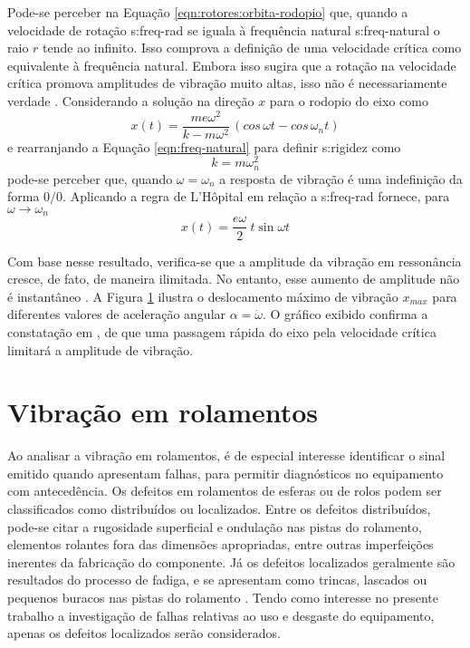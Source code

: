 \documentclass[12pt,oneside,english,brazil]{ucsmono}
\begin{document}
	Pode-se perceber na Equação \ref{eqn:rotores:orbita-rodopio} que, quando a velocidade de rotação \gls{s:freq-rad} se iguala à frequência natural \gls{s:freq-natural} o raio $ r $ tende ao infinito. Isso comprova a definição de uma velocidade crítica como equivalente à frequência natural. Embora isso sugira que a rotação na velocidade crítica promova amplitudes de vibração muito altas, isso não é necessariamente verdade \cite{dimarogonas:1995}. Considerando a solução na direção $ x $ para o rodopio do eixo como \cite{dimarogonas:1995}
	\begin{equation}
		x(t) = \frac{m\mathit{e}\omega^2}{k-m\omega^2}\,(cos\,\omega t - cos\,\omega_n t)
	\end{equation}
	e rearranjando a Equação \ref{eqn:freq-natural} para definir \gls{s:rigidez} como \[ k = m\omega_n^2 \] pode-se perceber que, quando $ \omega = \omega_n $ a resposta de vibração é uma indefinição da forma $ 0/0 $. Aplicando a regra de L'Hôpital em relação a \gls{s:freq-rad} fornece, para $ \omega\to\omega_n $
	\begin{equation}
		x(t) = \frac{\mathit{e}\omega}{2}\ t\sin\omega t
	\end{equation}
	
	Com base nesse resultado, verifica-se que a amplitude da vibração em ressonância cresce, de fato, de maneira ilimitada. No entanto, esse aumento de amplitude não é instantâneo \cite{dimarogonas:1995}. A Figura \ref{fig:aceleracao-vel-critica} ilustra o deslocamento máximo de vibração $ x_{max} $ para diferentes valores de aceleração angular $ \alpha = \dot{\omega} $. O gráfico exibido confirma a constatação em \cite{rao:2008}, de que uma passagem rápida do eixo pela velocidade crítica limitará a amplitude de vibração.
	\begin{figure}
		\label{fig:aceleracao-vel-critica}
	\end{figure}

	\section{Vibração em rolamentos}
	Ao analisar a vibração em rolamentos, é de especial interesse identificar o sinal emitido quando apresentam falhas, para permitir diagnósticos no equipamento com antecedência. Os defeitos em rolamentos de esferas ou de rolos podem ser classificados como distribuídos ou localizados. Entre os defeitos distribuídos, pode-se citar a rugosidade superficial e ondulação nas pistas do rolamento, elementos rolantes fora das dimensões apropriadas, entre outras imperfeições inerentes da fabricação do componente. Já os defeitos localizados geralmente são resultados do processo de fadiga, e se apresentam como trincas, lascados ou pequenos buracos nas pistas do rolamento \cite{tandon:1997,sassi:2007}. Tendo como interesse no presente trabalho a investigação de falhas relativas ao uso e desgaste do equipamento, apenas os defeitos localizados serão considerados.
	
\end{document}
